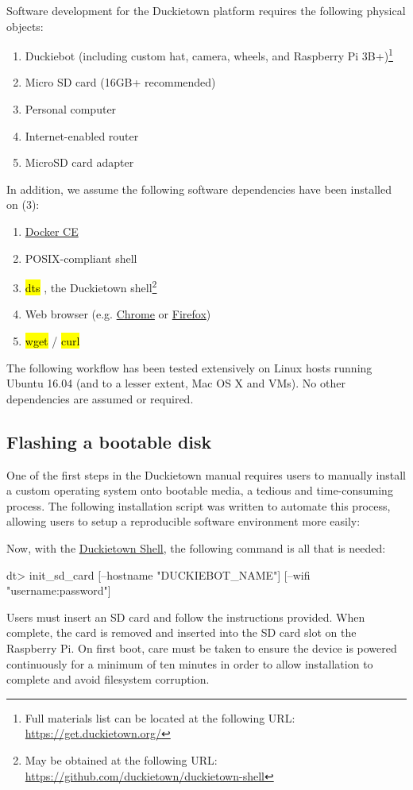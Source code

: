 \documentclass[12pt,initial,twoside,maitrise]{dms}
\newcommand{\inline}[1]{%
    \begingroup%
    \sethlcolor{slightgray}%
    \hl{\ttfamily\small #1}%
    \endgroup
}
\numberwithin{equation}{section}
\numberwithin{table}{chapter}
\numberwithin{figure}{chapter}
\begin{document}
\noindent Software development for the Duckietown platform requires the following physical objects:
%
\begin{enumerate}
    \item Duckiebot (including custom hat, camera, wheels, and Raspberry Pi 3B+)\footnote{Full materials list can be located at the following URL: \url{https://get.duckietown.org/}}
    \item Micro SD card (16GB+ recommended)
    \item Personal computer
    \item Internet-enabled router
    \item MicroSD card adapter
\end{enumerate}
%
In addition, we assume the following software dependencies have been installed on (3):
%
\begin{enumerate}[label=(\alph*)]
    \item \href{https://get.docker.com}{Docker CE}
    \item POSIX-compliant shell
    \item \inline{dts}, the Duckietown shell\footnote{May be obtained at the following URL: \url{https://github.com/duckietown/duckietown-shell}}
    \item Web browser (e.g. \href{https://www.google.com/chrome/}{Chrome} or \href{http://mozilla.org/firefox/}{Firefox})
    \item \inline{wget}/\inline{curl}
\end{enumerate}

\noindent The following workflow has been tested extensively on Linux hosts running Ubuntu 16.04 (and to a lesser extent, Mac OS X and VMs). No other dependencies are assumed or required.

\subsection{Flashing a bootable disk}

One of the first steps in the Duckietown manual requires users to manually install a custom operating system onto bootable media, a tedious and time-consuming process. The following installation script was written to automate this process, allowing users to setup a reproducible software environment more easily:

%
Now, with the \href{https://github.com/duckietown/duckietown-shell}{Duckietown Shell}, the following command is all that is needed:
%
\begin{dtslisting}
dt> init_sd_card [--hostname "DUCKIEBOT_NAME"] [--wifi "username:password"]
\end{dtslisting}
%
Users must insert an SD card and follow the instructions provided. When complete, the card is removed and inserted into the SD card slot on the Raspberry Pi. On first boot, care must be taken to ensure the device is powered continuously for a minimum of ten minutes in order to allow installation to complete and avoid filesystem corruption.
\end{document}
